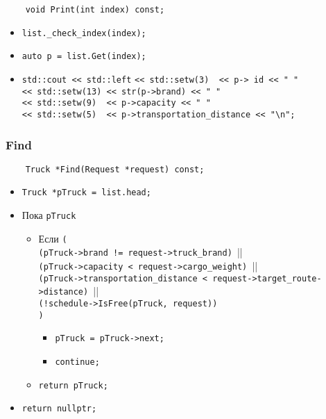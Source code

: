 \begin{lstlisting}
    void Print(int index) const;
\end{lstlisting}

\begin{itemize}
    \item \verb|list._check_index(index);|
    \item \verb|auto p = list.Get(index);|
    \item \verb|std::cout << std::left|
          \verb|<< std::setw(3)  << p-> id << " "|\\
          \verb|<< std::setw(13) << str(p->brand) << " "|\\
          \verb|<< std::setw(9)  << p->capacity << " "|\\
          \verb|<< std::setw(5)  << p->transportation_distance << "\n";|
\end{itemize}

\subsubsection{Find}

\begin{lstlisting}
    Truck *Find(Request *request) const;
\end{lstlisting}

\begin{itemize}
    \item \verb|Truck *pTruck = list.head;|
    \item Пока \verb|pTruck|
    \begin{itemize}
        \item Если \verb|(|\\
        \verb|(pTruck->brand != request->truck_brand) |||\\
        \verb|(pTruck->capacity < request->cargo_weight) |||\\ 
        \verb|(pTruck->transportation_distance < request->target_route->distance) |||\\
        \verb|(!schedule->IsFree(pTruck, request))|\\
        \verb|)|
            \begin{itemize}
                \item \verb|pTruck = pTruck->next;|
                \item \verb|continue;|
            \end{itemize}
        \item \verb|return pTruck;|
    \end{itemize}
    \item \verb|return nullptr;|
\end{itemize}

